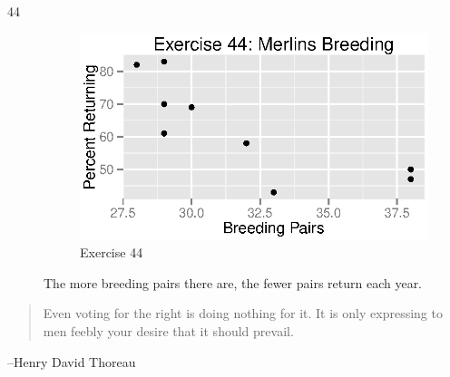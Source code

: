 \documentclass{exam}
\begin{document}
\begin{description}
      \item[44]
        \begin{figure}[H]
          \centering
          \includegraphics{figures/ex44.eps}
          \caption{Exercise 44}
        \end{figure}

        The more breeding pairs there are, the fewer pairs return each year.
    \end{description}


  \else
    \vspace{11 cm}
    \begin{quote}
      \begin{em}
        Even voting for the right is doing nothing for it. It is only expressing to men
        feebly your desire that it should prevail. 
      \end{em}
    \end{quote}
    \hspace{1 cm} --Henry David Thoreau
  \fi
\end{document}
